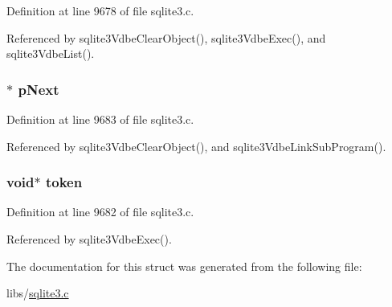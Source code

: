 Definition at line 9678 of file sqlite3.\+c.



Referenced by sqlite3\+Vdbe\+Clear\+Object(), sqlite3\+Vdbe\+Exec(), and sqlite3\+Vdbe\+List().

\hypertarget{struct_sub_program_a0346e5d5fcebee906c306464a9e2649a}{}
\subsubsection[{p\+Next}]{$\ast$ p\+Next}\label{struct_sub_program_a0346e5d5fcebee906c306464a9e2649a}


Definition at line 9683 of file sqlite3.\+c.



Referenced by sqlite3\+Vdbe\+Clear\+Object(), and sqlite3\+Vdbe\+Link\+Sub\+Program().

\hypertarget{struct_sub_program_aa80a17db18ac71350fa401959c59e642}{}
\subsubsection[{token}]{\setlength{\rightskip}{0pt plus 5cm}void$\ast$ token}\label{struct_sub_program_aa80a17db18ac71350fa401959c59e642}


Definition at line 9682 of file sqlite3.\+c.



Referenced by sqlite3\+Vdbe\+Exec().



The documentation for this struct was generated from the following file\+:\begin{DoxyCompactItemize}
\item 
libs/\hyperlink{sqlite3_8c}{sqlite3.\+c}\end{DoxyCompactItemize}

